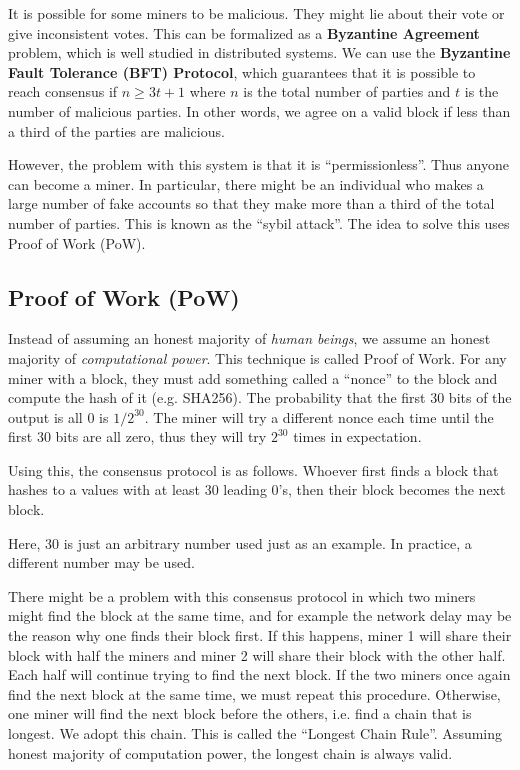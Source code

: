 \begin{center}
    \small
    \def\svgwidth{\linewidth}
    
\end{center}

It is possible for some miners to be malicious. They might lie about their vote or give inconsistent votes. This can be formalized as a \textbf{Byzantine Agreement} problem, which is well studied in distributed systems. We can use the \textbf{Byzantine Fault Tolerance (BFT) Protocol}, which guarantees that it is possible to reach consensus if $n \geq 3t + 1$ where $n$ is the total number of parties and $t$ is the number of malicious parties. In other words, we agree on a valid block if less than a third of the parties are malicious.

However, the problem with this system is that it is ``permissionless''. Thus anyone can become a miner. In particular, there might be an individual who makes a large number of fake accounts so that they make more than a third of the total number of parties. This is known as the ``sybil attack''. The idea to solve this uses Proof of Work (PoW).

\subsection{Proof of Work (PoW)}

Instead of assuming an honest majority of \textit{human beings}, we assume an honest majority of \textit{computational power}. This technique is called Proof of Work. For any miner with a block, they must add something called a ``nonce'' to the block and compute the hash of it (e.g. SHA256). The probability that the first 30 bits of the output is all 0 is $1/2^{30}$. The miner will try a different nonce each time until the first 30 bits are all zero, thus they will try $2^{30}$ times in expectation.

Using this, the consensus protocol is as follows. Whoever first finds a block that hashes to a values with at least 30 leading 0's, then their block becomes the next block.

\begin{remark}
    Here, 30 is just an arbitrary number used just as an example. In practice, a different number may be used.
\end{remark}

There might be a problem with this consensus protocol in which two miners might find the block at the same time, and for example the network delay may be the reason why one finds their block first. If this happens, miner 1 will share their block with half the miners and miner 2 will share their block with the other half. Each half will continue trying to find the next block. If the two miners once again find the next block at the same time, we must repeat this procedure. Otherwise, one miner will find the next block before the others, i.e. find a chain that is longest. We adopt this chain. This is called the ``Longest Chain Rule''. Assuming honest majority of computation power, the longest chain is always valid.

